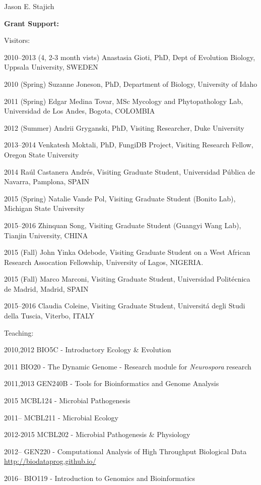 \documentclass[10pt]{article}
\begin{document}
\begin{cv}{\centerline{Jason E. Stajich}}
\begin{cvlistcompact}{\bf Grant Support:}
\begin{cvlistcompact}{Visitors:}
\item [2010--2013 (4, 2-3 month vists)] Anastasia Gioti, PhD,
  Dept of Evolution Biology, Uppsala University, SWEDEN
\item [2010 (Spring)] Suzanne Joneson, PhD, Department of Biology, University of Idaho
\item [2011 (Spring)] Edgar Medina Tovar, MSc
  Mycology and Phytopathology Lab, Universidad de Los Andes, Bogota, COLOMBIA
\item [2012 (Summer)] Andrii Gryganski, PhD, Visiting Researcher, Duke University 
\item [2013--2014] Venkatesh Moktali, PhD,
  FungiDB Project, Visiting Research Fellow, Oregon State University
\item [2014] Ra\'{u}l Castanera Andr\'{e}s, Visiting Graduate Student,
  Universidad P\'{u}blica de Navarra, Pamplona, SPAIN
\item [2015 (Spring)] Natalie Vande Pol, Visiting Graduate Student (Bonito Lab), Michigan State University
\item [2015--2016] Zhinquan Song, Visiting Graduate Student (Guangyi
  Wang Lab), Tianjin University, CHINA
\item [2015 (Fall)] John Yinka Odebode, Visiting Graduate Student on a West
  African Research Assocation Fellowship, University of Lagos, NIGERIA.
\item [2015 (Fall)] Marco Marconi, Visiting Graduate Student,
    Universidad Polit\'{e}cnica de Madrid, Madrid, SPAIN
\item [2015--2016] Claudia Coleine, Visiting Graduate Student,
    Universit\'{a} degli Studi della Tuscia, Viterbo, ITALY
\end{cvlistcompact}

\begin{cvlistcompact}{Teaching:}
\item [2010,2012] BIO5C - Introductory Ecology \& Evolution 
\item [2011] BIO20 - The Dynamic Genome - Research module for \textit{Neurospora} research
\item [2011,2013] GEN240B - Tools for Bioinformatics and Genome Analysis
\item [2015] MCBL124 - Microbial Pathogenesis
\item [2011--] MCBL211 - Microbial Ecology
\item [2012-2015] MCBL202 - Microbial Pathogenesis \& Physiology
\item [2012--] GEN220 - Computational Analysis of High Throughput Biological Data \url{http://biodataprog.github.io/}
\item [2016--] BIO119 - Introduction to Genomics and Bioinformatics


\end{cvlistcompact}
\end{cvlistcompact}
\end{cv}
\end{document}

